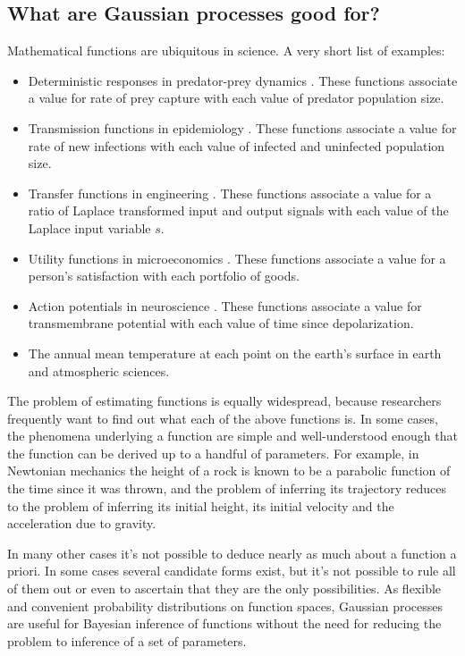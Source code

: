 \documentclass{manual}
\begin{document}
\subsection{What are Gaussian processes good for?}\label{sub:applications}
Mathematical functions are ubiquitous in science. A very short list of examples:
\begin{itemize}
    \item Deterministic responses in predator-prey dynamics \cite{mathecol}. These functions associate a value for rate of prey capture with each value of predator population size.
    \item Transmission functions in epidemiology \cite{andersonmay}. These functions associate a value for rate of new infections with each value of infected and uninfected population size.
    \item Transfer functions in engineering \cite{duffy}. These functions associate a value for a ratio of Laplace transformed input and output signals with each value of the Laplace input variable $s$.
    \item Utility functions in microeconomics \cite{microecon}. These functions associate a value for a person's satisfaction with each portfolio of goods.
    \item Action potentials in neuroscience \cite{neuro}. These functions associate a value for transmembrane potential with each value of time since depolarization.
    \item The annual mean temperature at each point on the earth's surface in earth and atmospheric sciences.
\end{itemize}

The problem of estimating functions is equally widespread, because researchers frequently want to find out what each of the above functions is. In some cases, the phenomena underlying a function are simple and well-understood enough that the function can be derived up to a handful of parameters. For example, in Newtonian mechanics the height of a rock is known to be a parabolic function of the time since it was thrown, and the problem of inferring its trajectory reduces to the problem of inferring its initial height, its initial velocity and the acceleration due to gravity.

In many other cases it's not possible to deduce nearly as much about a function a priori. In some cases several candidate forms exist, but it's not possible to rule all of them out or even to ascertain that they are the only possibilities. As flexible and convenient probability distributions on function spaces, Gaussian processes are useful for Bayesian inference of functions without the need for reducing the problem to inference of a set of parameters.
\end{document}
